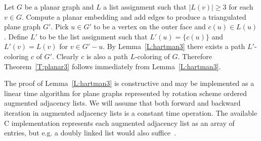 \documentclass[12pt,letterpaper]{article}
\theoremstyle{plain}
\theoremstyle{definition}
\theoremstyle{break}
\begin{document}
Let $G$ be a planar graph and $L$ a list assignment such
that $|L(v)|\ge 3$ for each $v\in G$. Compute a planar embedding and add edges
to produce a triangulated plane graph $G'$. Pick $u\in G'$ to be a vertex
on the outer face and $c(u)\in L(u)$. Define $L'$ to be the list
assignment such that $L'(u)=\{c(u)\}$ and $L'(v)=L(v)$ for $v\in G'-u$.
By Lemma~\ref{L:hartman3} there exists a path $L'$-coloring $c$ of $G'$.
Clearly $c$ is also a path $L$-coloring of $G$.
Therefore Theorem~\ref{T:planar3} follows immediately from 
Lemma~\ref{L:hartman3}.

The proof of Lemma~\ref{L:hartman3} is constructive and may be
implemented as a linear time algorithm for plane graphs represented by
rotation scheme ordered augmented adjacency lists.
We will assume that both forward and backward iteration in augmented adjacency
lists
is a constant time operation.
The
available C implementation represents each augmented adjacency list as an array
of entries, but e.g. a doubly linked list would also suffice~\cite{Bro2017}.
\end{document}
